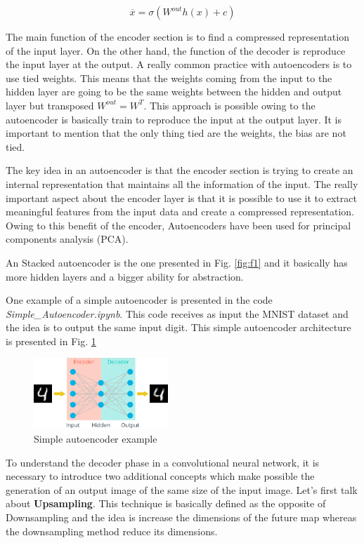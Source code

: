 \documentclass{article}
\begin{document}
\begin{equation}
\overline{x} = \sigma(W^{out}h(x) + c)
\label{eq:2}
\end{equation}

The main function of the encoder section is to find a compressed representation of the input layer. On the other hand, the function of the decoder is reproduce the input layer at the output. A really common practice with autoencoders is to use tied weights. This means that the weights coming from the input to the hidden layer are going to be the same weights between the hidden and output layer but transposed \(W^{out} = W^T\). This approach is possible owing to the autoencoder is basically train to reproduce the input at the output layer. It is important to mention that the only thing tied are the weights, the bias are not tied.

The key idea in an autoencoder is that the encoder section is trying to create an internal representation that maintains all the information of the input. The really important aspect about the encoder layer is that it is possible to use it to extract meaningful features from the input data and create a compressed representation. Owing to this benefit of the encoder, Autoencoders have been used for principal components analysis (PCA).

An Stacked autoencoder is the one presented in Fig. \ref{fig:f1} and it basically has more hidden layers and a bigger ability for abstraction.

One example of a simple autoencoder is presented in the code \textit{Simple\_Autoencoder.ipynb}. This code receives as input the MNIST dataset and the idea is to output the same input digit. This simple autoencoder architecture is presented in Fig. \ref{fig:f4}

\begin{figure}[ht]
    \centering
    \includegraphics[width=0.45\textwidth,height=0.45\textheight,keepaspectratio]{images/simple_autoencoder.png}
    \captionsetup{justification=centering}
    \caption{Simple autoencoder example}
    \label{fig:f4}
\end{figure}

To understand the decoder phase in a convolutional neural network, it is necessary to introduce two additional concepts which make possible the generation of an output image of the same size of the input image. Let's first talk about \textbf{Upsampling}. This technique is basically defined as the opposite of Downsampling and the idea is increase the dimensions of the future map whereas the downsampling method reduce its dimensions. 
\end{document}
